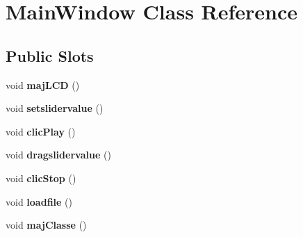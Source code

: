 \hypertarget{class_main_window}{\section{Main\-Window Class Reference}
\label{class_main_window}
}
\subsection*{Public Slots}
\begin{DoxyCompactItemize}
\item 
\hypertarget{class_main_window_a768a8555eecc86ac8d8b6a8ce20c2fc6}{void {\bfseries maj\-L\-C\-D} ()}\label{class_main_window_a768a8555eecc86ac8d8b6a8ce20c2fc6}

\item 
\hypertarget{class_main_window_a1dd604dd3fe7d6929e1c6feb9062ec86}{void {\bfseries setslidervalue} ()}\label{class_main_window_a1dd604dd3fe7d6929e1c6feb9062ec86}

\item 
\hypertarget{class_main_window_a00dbc85bb741bb161291386aa4873fc8}{void {\bfseries clic\-Play} ()}\label{class_main_window_a00dbc85bb741bb161291386aa4873fc8}

\item 
\hypertarget{class_main_window_ad09b9f8a76b015f8a5db10cf00914d0c}{void {\bfseries dragslidervalue} ()}\label{class_main_window_ad09b9f8a76b015f8a5db10cf00914d0c}

\item 
\hypertarget{class_main_window_a7a8e0b8e6acc3e7d4ac1692b511075ff}{void {\bfseries clic\-Stop} ()}\label{class_main_window_a7a8e0b8e6acc3e7d4ac1692b511075ff}

\item 
\hypertarget{class_main_window_a65b751746f63054d456dc6a315bead5d}{void {\bfseries loadfile} ()}\label{class_main_window_a65b751746f63054d456dc6a315bead5d}

\item 
\hypertarget{class_main_window_af4fdfdab16ba144e20173c81f3f1c06b}{void {\bfseries maj\-Classe} ()}\label{class_main_window_af4fdfdab16ba144e20173c81f3f1c06b}

\end{DoxyCompactItemize}
